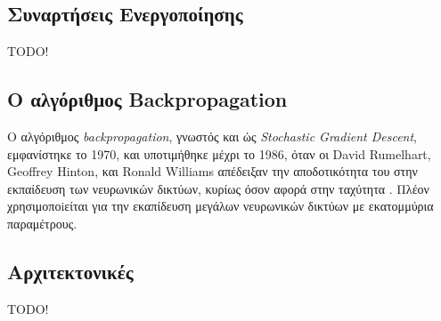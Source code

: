\subsection{Συναρτήσεις Ενεργοποίησης}

TODO!

\subsection{Ο αλγόριθμος Backpropagation}

Ο αλγόριθμος \emph{backpropagation}, γνωστός και ώς \emph{Stochastic Gradient Descent},
εμφανίστηκε το 1970, και υποτιμήθηκε
μέχρι το 1986, όταν οι David Rumelhart, Geoffrey Hinton, και Ronald Williams
απέδειξαν την αποδοτικότητα του στην εκπαίδευση των νευρωνικών δικτύων, κυρίως
όσον αφορά στην ταχύτητα \cite{rumelhart1988learning}.
Πλέον χρησιμοποiείται για την εκαπίδευση
μεγάλων νευρωνικών δικτύων με εκατομμύρια παραμέτρους.

\subsection{Αρχιτεκτονικές}

TODO!

